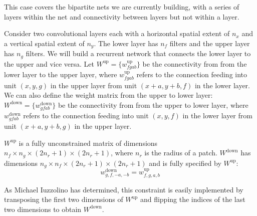 \documentclass[11pt,letterpaper]{article}
\begin{document}
This case covers the bipartite nets we are currently building, with
a series of layers within the net and connectivity between layers but
not within a layer.

Consider two convolutional layers each with a horizontal spatial extent
of $n_x$ and a vertical spatial extent of $n_y$.
The lower layer has $n_f$ filters and the upper layer has $n_g$ filters.
We will build a recurrent network that connects the lower layer to the upper
and vice versa.  Let $W^{\mathrm{up}} = \{ w_{fgab}^{\mathrm{up}} \}$ be the 
connectivity from from the lower layer to the upper layer, 
where $w_{fgab}^{\mathrm{up}}$ refers to the connection feeding into
unit $(x,y,g)$ in the upper layer from unit $(x+a,y+b,f)$ in the lower layer.
We can also define the weight matrix from the upper to lower layer:
$W^{\mathrm{down}} = \{ w_{gfab}^{\mathrm{down}} \}$ be the 
connectivity from from the upper to lower layer,
where $w_{gfab}^{\mathrm{down}}$ refers to the connection feeding into
unit $(x,y,f)$ in the lower layer from unit $(x+a,y+b,g)$ in the upper layer.

$W^\mathrm{up}$  is a fully unconstrained matrix of dimensions $n_f \times n_g
\times (2 n_r + 1) \times (2 n_r + 1)$, where $n_r$ is the radius of a patch.
$W^\mathrm{down}$ has dimensions $n_g \times n_f \times (2 n_r + 1) \times (2 n_r +
1)$ and is fully specified by $W^\mathrm{up}$:
\[
w_{g,f,-a,-b}^{\mathrm{down}} = w_{f,g,a,b}^{\mathrm{up}} 
\]

As Michael Iuzzolino has determined, this constraint is easily implemented
by transposing the first two dimensions of $W^\mathrm{up}$ and flipping the
indices of the last two dimensions  to obtain $W^\mathrm{down}$.


%
\small
%
\end{document}
